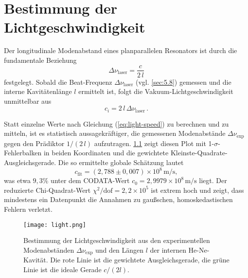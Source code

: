  
 
\chapter{Bestimmung der Lichtgeschwindigkeit}

Der longitudinale Modenabstand eines planparallelen Resonators ist durch die fundamentale Beziehung  
\begin{equation*}
  \Delta\nu_{\mathrm{laser}} = \frac{c}{2\,l}
\end{equation*}
festgelegt. Sobald die Beat-Frequenz \(\Delta\nu_{\mathrm{laser}}\) (vgl. \cref{sec:5.8}) gemessen und die interne Kavitätenlänge \(l\) ermittelt ist, folgt die Vakuum-Lichtgeschwindigkeit unmittelbar aus  
\begin{equation} \label{eq:light-speed}
  c_i = 2\,l\,\Delta\nu_{\mathrm{laser}}\,.
\end{equation}

Statt einzelne Werte nach Gleichung (\cref{eq:light-speed}) zu berechnen und zu mitteln, ist es statistisch aussagekräftiger, die gemessenen Modenabstände \(\Delta\nu_{\mathrm{exp}}\) gegen den Prädiktor \(1/(2\,l)\) aufzutragen. \cref{fig:light-speed} zeigt diesen Plot mit 1-\(\sigma\)-Fehlerbalken in beiden Koordinaten und die gewichtete Kleinste-Quadrate-Ausgleichsgerade. Die so ermittelte globale Schätzung lautet  
\[
  c_{\mathrm{fit}} = (2{,}788 \pm 0{,}007)\times10^{8}\,\mathrm{m/s},
\]  
was etwa \(9{,}3\%\) unter dem CODATA-Wert \cite{codata} \(c_0 = 2{,}9979\times10^{8}\,\mathrm{m/s}\) liegt. Der reduzierte Chi-Quadrat-Wert  
\(\chi^2/\mathrm{dof} = 2{,}2\times10^5\)  
ist extrem hoch und zeigt, dass mindestens ein Datenpunkt die Annahmen zu gaußschen, homoskedastischen Fehlern verletzt.
\begin{figure}
  \centering
  \texttt{[image: light.png]}
  \caption{Bestimmung der Lichtgeschwindigkeit aus den experimentellen Modenabständen \(\Delta\nu_{\mathrm{exp}}\) und den Längen \(l\) der internen He-Ne-Kavität. Die rote Linie ist die gewichtete Ausgleichsgerade, die grüne Linie ist die ideale Gerade \(c/(2l)\).}
  \label{fig:light-speed}
\end{figure}

